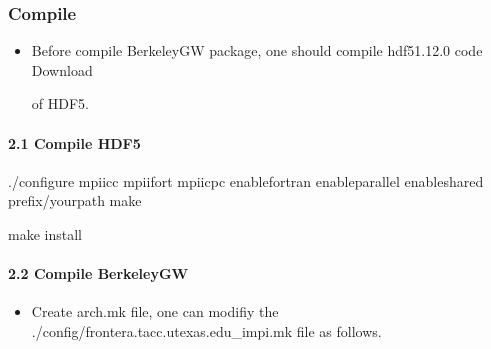 \documentclass[a4paper,12pt,english]{sphinxmanual}
\begin{document}
\subsubsection{Compile}
\label{\detokenize{compile/BerkeleyGW_3.0.1:compile}}\begin{itemize}
\item {} 
\sphinxAtStartPar
Before compile BerkeleyGW package, one should compile hdf5\sphinxhyphen{}1.12.0 code Download %
\begin{footnote}[12]\sphinxAtStartFootnote
{}
%
\end{footnote} of HDF5.

\end{itemize}


\paragraph{2.1 Compile HDF5}
\label{\detokenize{compile/BerkeleyGW_3.0.1:compile-hdf5}}
\begin{sphinxVerbatim}[commandchars=\\\{\}]
./configure mpiicc mpiifort mpiicpc 
    \PYGZhy{}\PYGZhy{}enable\PYGZhy{}fortran \PYGZhy{}\PYGZhy{}enable\PYGZhy{}parallel \PYGZhy{}\PYGZhy{}enable\PYGZhy{}shared 
    \PYGZhy{}\PYGZhy{}prefix/your\PYGZus{}path
make

make install
\end{sphinxVerbatim}


\paragraph{2.2 Compile BerkeleyGW}
\label{\detokenize{compile/BerkeleyGW_3.0.1:compile-berkeleygw}}\begin{itemize}
\item {} 
\sphinxAtStartPar
Create arch.mk file, one can modifiy the ./config/frontera.tacc.utexas.edu\_impi.mk file as follows.

\end{itemize}
\end{document}
